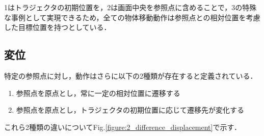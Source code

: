 1はトラジェクタの初期位置を，2は画面中央を参照点に含めることで，3の特殊な事例として実現できるため，全ての物体移動動作は参照点との相対位置を考慮した目標位置を持つとしている．

\subsection{変位}

特定の参照点に対し，動作はさらに以下の2種類が存在すると定義されている．

	\begin{enumerate}
		\item 参照点を原点とし，常に一定の相対位置に遷移する
		\item 参照点を原点とし，トラジェクタの初期位置に応じて遷移先が変化する
	\end{enumerate}
これら2種類の違いについてFig.\ref{figure:2_difference_displacement}で示す．


